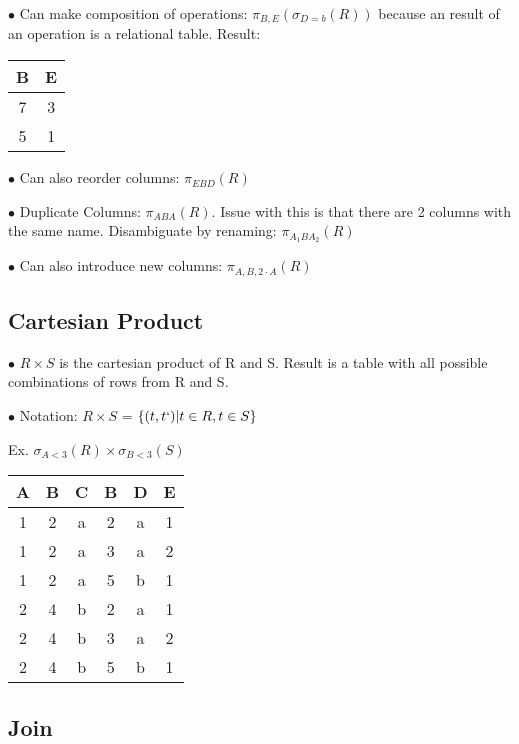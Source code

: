 \documentclass[twoside]{article}
\begin{document}
$\bullet$ Can make composition of operations: $\pi_{B,E}(\sigma_{D=b}(R))$ because 
an result of an operation is a relational table. Result:
\begin{table}[!htb]
    \centering
    \begin{tabular}{c|c}
        B & E \\
        \hline
        7 & 3 \\
        5 & 1 \\
    \end{tabular}
\end{table}

$\bullet$ Can also reorder columns: $\pi_{EBD}(R)$

$\bullet$ Duplicate Columns: $\pi_{ABA}(R)$. Issue with this is that there are 2
columns with the same name. Disambiguate by renaming: $\pi_{A_1BA_2}(R)$

$\bullet$ Can also introduce new columns: $\pi_{A,B,2\cdot A}(R)$

\subsection*{Cartesian Product}
$\bullet$ $R \times S$ is the cartesian product of R and S. Result is a table 
with all possible combinations of rows from R and S. 

$\bullet$ Notation: $R \times S$ = $\{(t,t`) | t \in R, t \in S\}$

Ex. $\sigma_{A<3}(R) \times \sigma_{B<3}(S)$
\begin{table}[!htb]
    \centering
    \begin{tabular}{c|c|c|c|c|c}
        A & B & C & B & D & E \\
        \hline
        1 & 2 & a & 2 & a & 1 \\
        1 & 2 & a & 3 & a & 2 \\
        1 & 2 & a & 5 & b & 1 \\
        2 & 4 & b & 2 & a & 1 \\
        2 & 4 & b & 3 & a & 2 \\
        2 & 4 & b & 5 & b & 1 \\
    \end{tabular}
\end{table}

\subsection*{Join}
\end{document}
